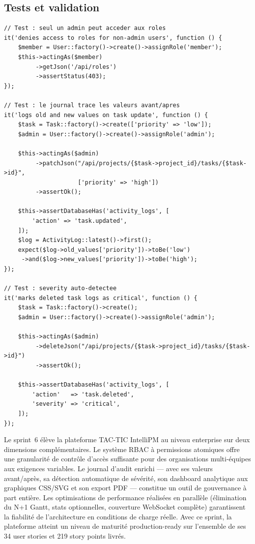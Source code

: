 \subsection{Tests et validation}

\begin{lstlisting}[style=phpstyle,caption={Tests unitaires — RBAC et journal d'audit},
  label={lst:tests_s6}]
// Test : seul un admin peut acceder aux roles
it('denies access to roles for non-admin users', function () {
    $member = User::factory()->create()->assignRole('member');
    $this->actingAs($member)
         ->getJson('/api/roles')
         ->assertStatus(403);
});

// Test : le journal trace les valeurs avant/apres
it('logs old and new values on task update', function () {
    $task = Task::factory()->create(['priority' => 'low']);
    $admin = User::factory()->create()->assignRole('admin');

    $this->actingAs($admin)
         ->patchJson("/api/projects/{$task->project_id}/tasks/{$task->id}",
                     ['priority' => 'high'])
         ->assertOk();

    $this->assertDatabaseHas('activity_logs', [
        'action' => 'task.updated',
    ]);
    $log = ActivityLog::latest()->first();
    expect($log->old_values['priority'])->toBe('low')
     ->and($log->new_values['priority'])->toBe('high');
});

// Test : severity auto-detectee
it('marks deleted task logs as critical', function () {
    $task = Task::factory()->create();
    $admin = User::factory()->create()->assignRole('admin');

    $this->actingAs($admin)
         ->deleteJson("/api/projects/{$task->project_id}/tasks/{$task->id}")
         ->assertOk();

    $this->assertDatabaseHas('activity_logs', [
        'action'   => 'task.deleted',
        'severity' => 'critical',
    ]);
});
\end{lstlisting}

\begin{chapconclusion}
Le sprint~6 élève la plateforme TAC-TIC IntelliPM au niveau enterprise sur deux
dimensions complémentaires. Le système RBAC à permissions atomiques offre une
granularité de contrôle d'accès suffisante pour des organisations multi-équipes
aux exigences variables. Le journal d'audit enrichi — avec ses valeurs avant/après,
sa détection automatique de sévérité, son dashboard analytique aux graphiques
CSS/SVG et son export PDF — constitue un outil de gouvernance à part entière.
Les optimisations de performance réalisées en parallèle (élimination du N+1 Gantt,
stats optionnelles, couverture WebSocket complète) garantissent la fiabilité de
l'architecture en conditions de charge réelle. Avec ce sprint, la plateforme
atteint un niveau de maturité production-ready sur l'ensemble de ses 34 user
stories et 219 story points livrés.
\end{chapconclusion}
